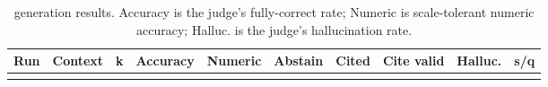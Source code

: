 \documentclass[
  11pt,
]{article}
\begin{document}
\begin{longtable}[]{@{}
  >{\raggedright\arraybackslash}p{}
  >{\raggedright\arraybackslash}p{}
  >{\raggedright\arraybackslash}p{}
  >{\raggedright\arraybackslash}p{}
  >{\raggedright\arraybackslash}p{}
  >{\raggedright\arraybackslash}p{}
  >{\raggedright\arraybackslash}p{}
  >{\raggedright\arraybackslash}p{}
  >{\raggedright\arraybackslash}p{}
  >{\raggedright\arraybackslash}p{}@{}}
\caption{generation results. Accuracy is the judge's fully-correct rate;
Numeric is scale-tolerant numeric accuracy; Halluc. is the judge's
hallucination rate.}\tabularnewline
\toprule\noalign{}
\begin{minipage}[b]{\linewidth}\raggedright
Run
\end{minipage} & \begin{minipage}[b]{\linewidth}\raggedright
Context
\end{minipage} & \begin{minipage}[b]{\linewidth}\raggedright
k
\end{minipage} & \begin{minipage}[b]{\linewidth}\raggedright
Accuracy
\end{minipage} & \begin{minipage}[b]{\linewidth}\raggedright
Numeric
\end{minipage} & \begin{minipage}[b]{\linewidth}\raggedright
Abstain
\end{minipage} & \begin{minipage}[b]{\linewidth}\raggedright
Cited
\end{minipage} & \begin{minipage}[b]{\linewidth}\raggedright
Cite valid
\end{minipage} & \begin{minipage}[b]{\linewidth}\raggedright
Halluc.
\end{minipage} & \begin{minipage}[b]{\linewidth}\raggedright
s/q
\end{minipage} \\
\midrule\noalign{}
\endfirsthead

\end{longtable}
\end{document}
